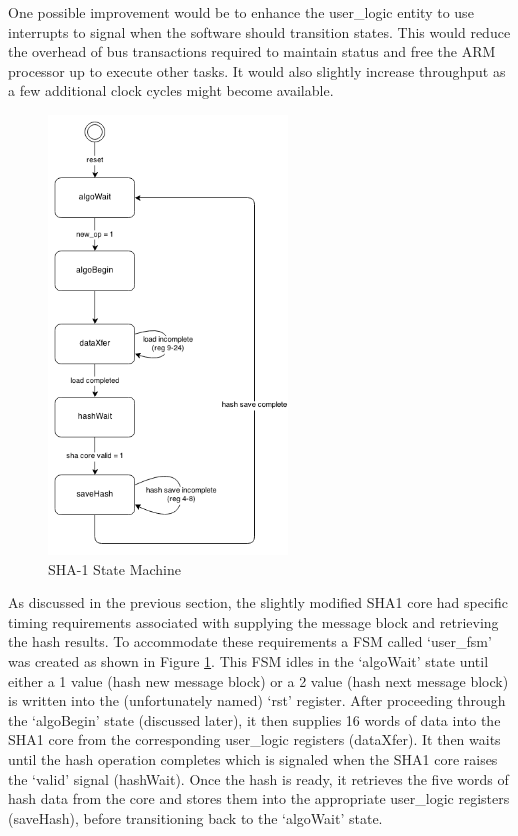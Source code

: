\documentclass[journal]{IEEEtran}
\begin{document}
One possible improvement would be to enhance the user\_logic entity to use interrupts to signal when the software should transition states.  This would reduce the overhead of bus transactions required to maintain status and free the ARM processor up to execute other tasks.  It would also slightly increase throughput as a few additional clock cycles might become available.
\begin{figure}[ht]
\centering
\includegraphics[width=2.5in]{UserLogicStateDiagram.png}
\caption{SHA-1 State Machine}
\label{fig_algoFSM}
\end{figure}
As discussed in the previous section, the slightly modified SHA1 core had specific timing requirements associated with supplying the message block and retrieving the hash results.  To accommodate these requirements a FSM called ‘user\_fsm’ was created as shown in Figure \ref{fig_algoFSM}.   This FSM idles in the ‘algoWait’ state until either a 1 value (hash new message block) or a 2 value (hash next message block) is written into the (unfortunately named) ‘rst’ register.  After proceeding through the ‘algoBegin’ state (discussed later), it then supplies 16 words of data into the SHA1 core from the corresponding user\_logic registers (dataXfer).  It then waits until the hash operation completes which is signaled when the SHA1 core raises the ‘valid’ signal (hashWait).  Once the hash is ready, it retrieves the five words of hash data from the core and stores them into the appropriate user\_logic registers (saveHash), before transitioning back to the ‘algoWait’ state.
\end{document}
